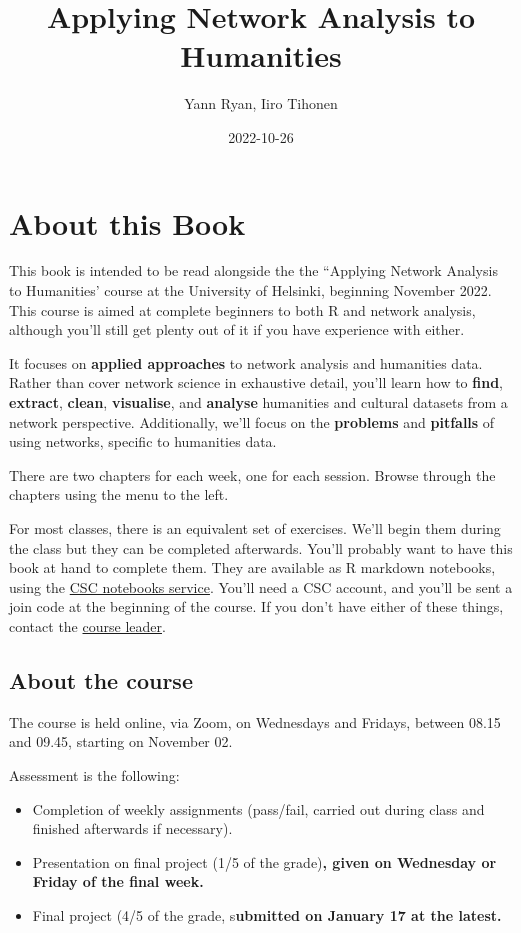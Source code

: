 \documentclass[
]{book}
\title{Applying Network Analysis to Humanities}
\author{Yann Ryan, Iiro Tihonen}
\date{2022-10-26}
\begin{document}
\maketitle

{
\setcounter{tocdepth}{1}
\tableofcontents
}
\hypertarget{about-this-book}{%
\chapter{About this Book}\label{about-this-book}}

This book is intended to be read alongside the the ``Applying Network
Analysis to Humanities' course at the University of Helsinki, beginning
November 2022. This course is aimed at complete beginners to both R and
network analysis, although you'll still get plenty out of it if you have
experience with either.

It focuses on \textbf{applied approaches} to network analysis and humanities
data. Rather than cover network science in exhaustive detail, you'll
learn how to \textbf{find}, \textbf{extract}, \textbf{clean}, \textbf{visualise}, and
\textbf{analyse} humanities and cultural datasets from a network perspective.
Additionally, we'll focus on the \textbf{problems} and \textbf{pitfalls} of using
networks, specific to humanities data.

There are two chapters for each week, one for each session. Browse
through the chapters using the menu to the left.

For most classes, there is an equivalent set of exercises. We'll begin
them during the class but they can be completed afterwards. You'll
probably want to have this book at hand to complete them. They are
available as R markdown notebooks, using the \href{https://notebooks.rahtiapp.fi/welcome}{CSC notebooks
service}. You'll need a CSC
account, and you'll be sent a join code at the beginning of the course.
If you don't have either of these things, contact the \href{mailto:yann.ryan@helinki.fi}{course
leader}.

\hypertarget{about-the-course}{%
\section{About the course}\label{about-the-course}}

The course is held online, via Zoom, on Wednesdays and Fridays, between
08.15 and 09.45, starting on November 02.

Assessment is the following:

\begin{itemize}
\item
  Completion of weekly assignments (pass/fail, carried out during
  class and finished afterwards if necessary).
\item
  Presentation on final project (1/5 of the grade)\textbf{, given on
  Wednesday or Friday of the final week.}
\item
  Final project (4/5 of the grade, s\textbf{ubmitted on January 17 at the
  latest.}
\end{itemize}
\end{document}
